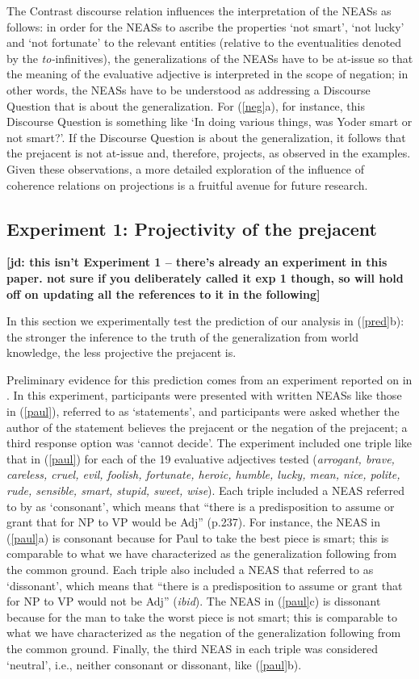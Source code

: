 \documentclass[11pt,fleqn]{article}
\newcommand{\6}{\mbox{$[\hspace*{-.6mm}[$}}
\newcommand{\9}{\mbox{$]\hspace*{-.6mm}]$}}
\newcommand{\jd}[1]{\textbf{\color{green}[jd: #1]}}
\begin{document}
The Contrast discourse relation influences the interpretation of the NEASs as follows: in order for the NEASs to ascribe the properties `not smart', `not lucky' and `not fortunate' to the relevant entities (relative to the eventualities denoted by the {\em to-}infinitives), the generalizations of the NEASs have to be at-issue so that the meaning of the evaluative adjective is interpreted in the scope of negation; in other words, the NEASs have to be understood as addressing a Discourse Question that is about the generalization. For (\ref{neg}a), for instance, this Discourse Question is something like `In doing various things, was Yoder smart or not smart?'. If the Discourse Question is about the generalization, it follows that the prejacent is not at-issue and, therefore, projects, as observed in the examples. Given these observations, a more detailed exploration of the influence of coherence relations on projections is a fruitful avenue for future research. 

\subsection{Experiment 1: Projectivity of the prejacent}\label{s42}
\jd{this isn't Experiment 1 -- there's already an experiment in this paper. not sure if you deliberately called it exp 1 though, so will hold off on updating all the references to it in the following}

In this section we experimentally test the prediction of our analysis in (\ref{pred}b): the stronger the inference to the truth of the generalization from world knowledge, the less projective the prejacent is.

Preliminary evidence for this prediction comes from an experiment reported on in \citealt{karttunen-etal2014}. In this experiment, participants were presented with written NEASs like those in (\ref{paul}), referred to as `statements', and participants were asked whether the author of the statement believes  the prejacent or the negation of the prejacent; a third response option was `cannot decide'. The experiment included one triple like that in (\ref{paul}) for each of the 19 evaluative adjectives tested ({\em arrogant, brave, careless, cruel, evil,
foolish, fortunate, heroic, humble, lucky, mean, nice, polite, rude,
sensible, smart, stupid, sweet, wise}). Each triple included a NEAS referred to by \citet{karttunen-etal2014} as `consonant', which means that ``there is a predisposition to assume or grant that for NP to VP would be Adj'' (p.237). For instance, the NEAS in (\ref{paul}a) is consonant because for Paul to take the best piece is smart; this is comparable to what we have characterized as the generalization following from the common ground. Each triple also included a NEAS that \citet{karttunen-etal2014} referred to as `dissonant', which means that ``there is a predisposition to assume or grant that for NP to VP would not be Adj'' ({\em ibid}). The NEAS in (\ref{paul}c) is dissonant because for the man to take the worst piece is not smart; this is comparable to what we have characterized as the negation of the generalization following from the common ground. Finally, the third NEAS in each triple was considered `neutral', i.e., neither consonant or dissonant, like (\ref{paul}b).
\end{document}
